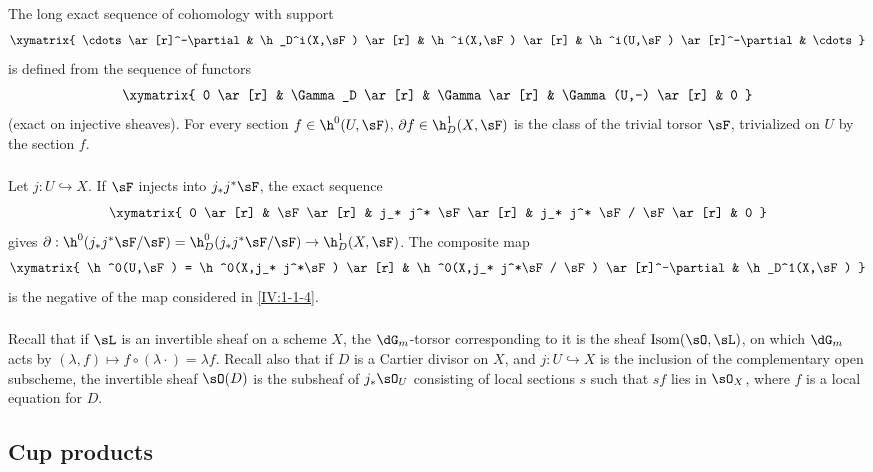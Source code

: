 The long exact sequence of cohomology with support
\[\xymatrix{
  \cdots \ar[r]^-\partial
    & \h_D^i(X,\sF) \ar[r]
    & \h^i(X,\sF) \ar[r]
    & \h^i(U,\sF) \ar[r]^-\partial
    & \cdots
}\]
is defined from the sequence of functors
\[\xymatrix{
  0 \ar[r]
    & \Gamma_D \ar[r]
    & \Gamma \ar[r]
    & \Gamma(U,-) \ar[r]
    & 0
}\]
(exact on injective sheaves). For every section $f\in \h^0(U,\sF)$,
$\partial f\in \h_D^1(X,\sF)$ is the class of the trivial torsor $\sF$,
trivialized on $U$ by the section $f$.






\subsubsection{}\label{IV:1-1-5}

\marginpar{!}Let $j:U\hookrightarrow X$. If $\sF$ injects into $j_* j^* \sF$, the exact
sequence
\[\xymatrix{
  0 \ar[r]
  & \sF \ar[r]
  & j_* j^* \sF \ar[r]
  & j_* j^* \sF / \sF \ar[r]
  & 0
}\]
gives
$\partial:\h^0(j_* j^*\sF/\sF) = \h_D^0(j_* j^* \sF/\sF) \to \h_D^1(X,\sF)$.
The composite map
\[\xymatrix{
  \h^0(U,\sF) = \h^0(X,j_* j^*\sF) \ar[r]
    & \h^0(X,j_* j^*\sF / \sF) \ar[r]^-\partial
    & \h_D^1(X,\sF)
}\]
is the negative of the map considered in \ref{IV:1-1-4}.






\subsubsection{}\label{IV:1-1-6}

Recall that if $\sL$ is an invertible sheaf on a scheme $X$, the
$\dG_m$-torsor corresponding to it is the sheaf
$\operatorname{Isom}(\sO,\sL)$, on which $\dG_m$ acts by
$(\lambda,f)\mapsto f\circ (\lambda\cdot) = \lambda f$. Recall also that if
$D$ is a Cartier divisor on $X$, and $j:U\hookrightarrow X$ is the inclusion
of the complementary open subscheme, the invertible sheaf $\sO(D)$ is the
subsheaf of $j_*\sO_U$ consisting of local sections $s$ such that $s f$ lies
in $\sO_X$, where $f$ is a local equation for $D$.











\subsection{Cup products}\label{IV:1-2}

